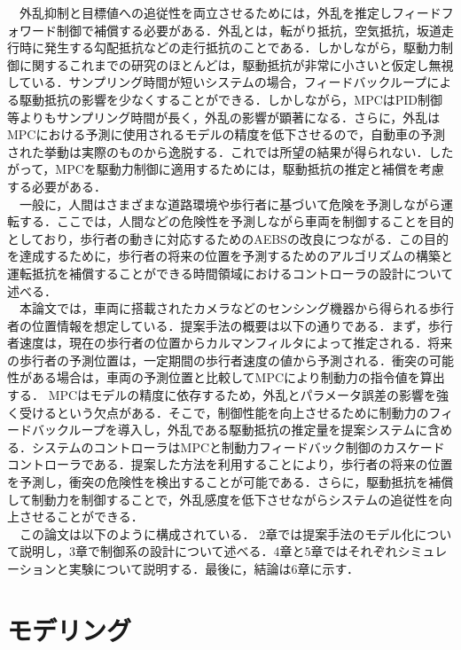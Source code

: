 　外乱抑制と目標値への追従性を両立させるためには，外乱を推定しフィードフォワード制御で補償する必要がある．外乱とは，転がり抵抗，空気抵抗，坂道走行時に発生する勾配抵抗などの走行抵抗のことである．しかしながら，駆動力制御に関するこれまでの研究のほとんどは，駆動抵抗が非常に小さいと仮定し無視している．サンプリング時間が短いシステムの場合，フィードバックループによる駆動抵抗の影響を少なくすることができる．しかしながら，MPCはPID制御等よりもサンプリング時間が長く，外乱の影響が顕著になる．さらに，外乱はMPCにおける予測に使用されるモデルの精度を低下させるので，自動車の予測された挙動は実際のものから逸脱する．これでは所望の結果が得られない．したがって，MPCを駆動力制御に適用するためには，駆動抵抗の推定と補償を考慮する必要がある．\\
　一般に，人間はさまざまな道路環境や歩行者に基づいて危険を予測しながら運転する．ここでは，人間などの危険性を予測しながら車両を制御することを目的としており，歩行者の動きに対応するためのAEBSの改良につながる．この目的を達成するために，歩行者の将来の位置を予測するためのアルゴリズムの構築と運転抵抗を補償することができる時間領域におけるコントローラの設計について述べる．\\
　本論文では，車両に搭載されたカメラなどのセンシング機器から得られる歩行者の位置情報を想定している．提案手法の概要は以下の通りである．まず，歩行者速度は，現在の歩行者の位置からカルマンフィルタによって推定される．将来の歩行者の予測位置は，一定期間の歩行者速度の値から予測される．衝突の可能性がある場合は，車両の予測位置と比較してMPCにより制動力の指令値を算出する． MPCはモデルの精度に依存するため，外乱とパラメータ誤差の影響を強く受けるという欠点がある．そこで，制御性能を向上させるために制動力のフィードバックループを導入し，外乱である駆動抵抗の推定量を提案システムに含める．システムのコントローラはMPCと制動力フィードバック制御のカスケードコントローラである．提案した方法を利用することにより，歩行者の将来の位置を予測し，衝突の危険性を検出することが可能である．さらに，駆動抵抗を補償して制動力を制御することで，外乱感度を低下させながらシステムの追従性を向上させることができる．\\
　この論文は以下のように構成されている． 2章では提案手法のモデル化について説明し，3章で制御系の設計について述べる．4章と5章ではそれぞれシミュレーションと実験について説明する．最後に，結論は6章に示す．\\

\section{モデリング}
